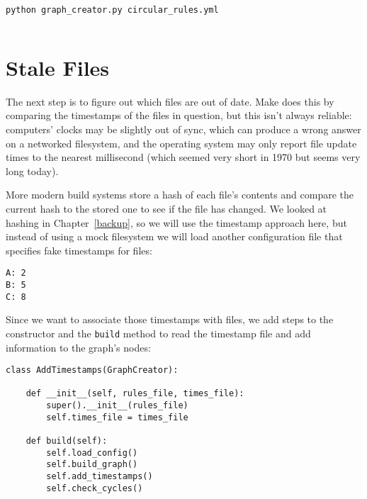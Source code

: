 \documentclass{scrbook}
\newcommand{\chapref}[1]{Chapter~\ref{#1}}
\begin{document}
\begin{lstlisting}[frame=single,frameround=tttt]
python graph_creator.py circular_rules.yml
\end{lstlisting}



\begin{lstlisting}[frame=single,frameround=tttt]

\end{lstlisting}


\section{Stale Files}\label{builder-timestamp}


The next step is to figure out which files are out of date.
Make does this by comparing the timestamps of the files in question,
but this isn't always reliable:
computers' clocks may be slightly out of sync,
which can produce a wrong answer on a networked filesystem,
and the operating system may only report file update times to the nearest millisecond
(which seemed very short in 1970 but seems very long today).


More modern build systems store a hash of each file's contents
and compare the current hash to the stored one to see if the file has changed.
We looked at hashing in \chapref{backup},
so we will use the timestamp approach here,
but instead of using a mock filesystem
we will load another configuration file that specifies fake timestamps for files:


\begin{lstlisting}[frame=single,frameround=tttt]
A: 2
B: 5
C: 8
\end{lstlisting}



Since we want to associate those timestamps with files,
we add steps to the constructor and the \texttt{build} method
to read the timestamp file and add information to the graph's nodes:


\begin{lstlisting}[frame=single,frameround=tttt]
class AddTimestamps(GraphCreator):

    def __init__(self, rules_file, times_file):
        super().__init__(rules_file)
        self.times_file = times_file

    def build(self):
        self.load_config()
        self.build_graph()
        self.add_timestamps()
        self.check_cycles()
\end{lstlisting}
\end{document}
